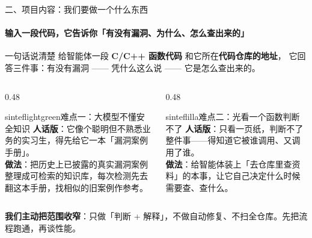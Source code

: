 \documentclass{beamer}
\begin{document}
\begin{frame}{二、项目内容：我们要做一个什么东西}
\framesubtitle{输入一段代码，它告诉你「有没有漏洞、为什么、怎么查出来的」}
\small
\begin{block}{一句话说清楚}
给智能体一段 \textbf{C/C++ 函数代码} 和它所在\textbf{代码仓库的地址}，
它回答三件事：\alert{有没有漏洞} —— \alert{凭什么这么说} —— \alert{它是怎么查出来的}。
\end{block}
\begin{columns}[t]
\begin{column}{0.48\textwidth}
\begin{colorblock}[black]{sinteflightgreen}{难点一：大模型不懂安全知识}
\textbf{人话版}：它像个聪明但不熟悉业务的实习生，得先给它一本「漏洞案例手册」。\\
\textbf{做法}：把历史上已披露的真实漏洞案例整理成可检索的知识库，每次检测先去翻这本手册，找相似的旧案例作参考。
\end{colorblock}
\end{column}
\begin{column}{0.48\textwidth}
\begin{colorblock}[white]{sinteflilla}{难点二：光看一个函数判断不了}
\textbf{人话版}：只看一页纸，判断不了整件事——得知道它被谁调用、又调用了谁。\\
\textbf{做法}：给智能体装上「去仓库里查资料」的本事，让它自己决定什么时候需要查、查什么。
\end{colorblock}
\end{column}
\end{columns}
\vspace{0.1em}
{\footnotesize \textbf{我们主动把范围收窄}：只做「判断 + 解释」，不做自动修复、不扫全仓库。先把流程跑通，再谈性能。}
\end{frame}
\end{document}
